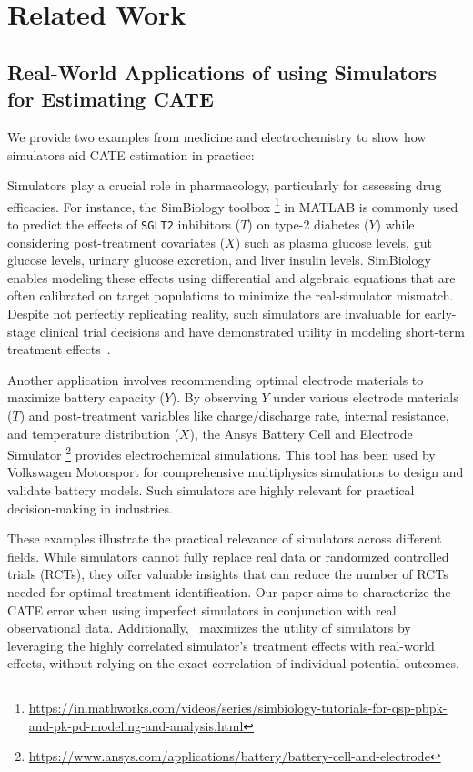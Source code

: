 \section{Related Work}


\subsection{Real-World Applications of using Simulators for Estimating CATE}
\label{app:sim_examples}
We provide two examples from medicine and electrochemistry to show how simulators aid CATE estimation in practice:

 Simulators play a crucial role in pharmacology, particularly for assessing drug efficacies. For instance, the SimBiology toolbox 
\footnote{\tiny{\url{https://in.mathworks.com/videos/series/simbiology-tutorials-for-qsp-pbpk-and-pk-pd-modeling-and-analysis.html}}} in MATLAB is commonly used to predict the effects of \verb|SGLT2| inhibitors ($T$) on type-2 diabetes ($Y$) while considering post-treatment covariates ($X$) such as plasma glucose levels, gut glucose levels, urinary glucose excretion, and liver insulin levels. SimBiology enables modeling these effects using differential and algebraic equations that are often calibrated on target populations to minimize the real-simulator mismatch. Despite not perfectly replicating reality, such simulators are invaluable for early-stage clinical trial decisions and have demonstrated utility in modeling short-term treatment effects~\citep{simbiology}.


 Another application involves recommending optimal electrode materials to maximize battery capacity ($Y$). By observing $Y$ under various electrode materials ($T$) and post-treatment variables like charge/discharge rate, internal resistance, and temperature distribution ($X$), the Ansys Battery Cell and Electrode Simulator \footnote{\tiny{\url{https://www.ansys.com/applications/battery/battery-cell-and-electrode}}} provides electrochemical simulations. This tool has been used by Volkswagen Motorsport for comprehensive multiphysics simulations to design and validate battery models. Such simulators are highly relevant for practical decision-making in industries.

These examples illustrate the practical relevance of simulators across different fields. While simulators cannot fully replace real data or randomized controlled trials (RCTs), they offer valuable insights that can reduce the number of RCTs needed for optimal treatment identification. Our paper aims to characterize the CATE error when using imperfect simulators in conjunction with real observational data. Additionally, \our\ maximizes the utility of simulators by leveraging the highly correlated simulator's treatment effects with real-world effects, without relying on the exact correlation of individual potential outcomes.





